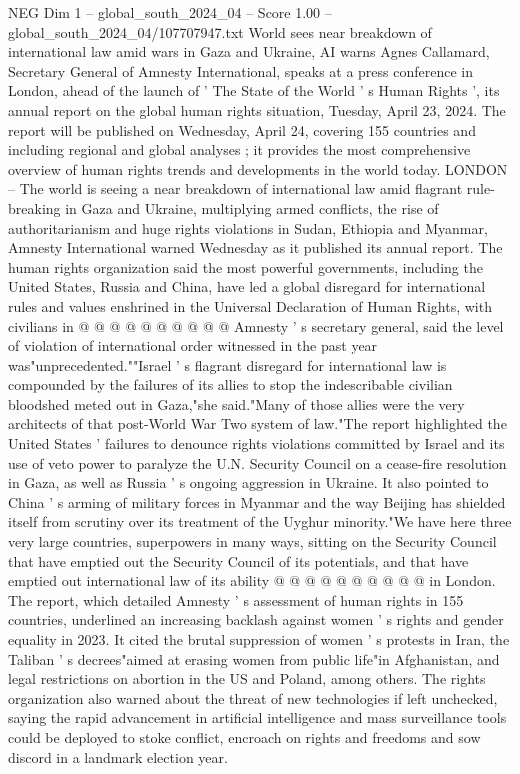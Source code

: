 \begin{textsample}{NEG Dim 1 – global\_south\_2024\_04 – Score 1.00 – global\_south\_2024\_04/107707947.txt}  \label{ex:f1_neg_303}
World sees near breakdown of international law amid wars in Gaza and Ukraine, AI warns Agnes Callamard, Secretary General of Amnesty International, speaks at a press conference in London, ahead of the launch of ' The State of the World ' s Human Rights ', its annual report on the global human rights situation, Tuesday, April 23, 2024.
The report will be published on Wednesday, April 24, covering 155 countries and including regional and global analyses ; it provides the most comprehensive overview of human rights trends and developments in the world today.
LONDON -- The world is seeing a near breakdown of international law amid flagrant rule-breaking in Gaza and Ukraine, multiplying armed conflicts, the rise of authoritarianism and huge rights violations in Sudan, Ethiopia and Myanmar, Amnesty International warned Wednesday as it published its annual report.
The human rights organization said the most powerful governments, including the United States, Russia and China, have led a global disregard for international rules and values enshrined in the Universal Declaration of Human Rights, with civilians in @ @ @ @ @ @ @ @ @ @ Amnesty ' s secretary general, said the level of violation of international order witnessed in the past year was"unprecedented.""Israel ' s flagrant disregard for international law is compounded by the failures of its allies to stop the indescribable civilian bloodshed meted out in Gaza,"she said."Many of those allies were the very architects of that post-World War Two system of law."The report highlighted the United States ' failures to denounce rights violations committed by Israel and its use of veto power to paralyze the U.N.
Security Council on a cease-fire resolution in Gaza, as well as Russia ' s ongoing aggression in Ukraine.
It also pointed to China ' s arming of military forces in Myanmar and the way Beijing has shielded itself from scrutiny over its treatment of the Uyghur minority."We have here three very large countries, superpowers in many ways, sitting on the Security Council that have emptied out the Security Council of its potentials, and that have emptied out international law of its ability @ @ @ @ @ @ @ @ @ @ in London.
The report, which detailed Amnesty ' s assessment of human rights in 155 countries, underlined an increasing backlash against women ' s rights and gender equality in 2023.
It cited the brutal suppression of women ' s protests in Iran, the Taliban ' s decrees"aimed at erasing women from public life"in Afghanistan, and legal restrictions on abortion in the US and Poland, among others.
The rights organization also warned about the threat of new technologies if left unchecked, saying the rapid advancement in artificial intelligence and mass surveillance tools could be deployed to stoke conflict, encroach on rights and freedoms and sow discord in a landmark election year.

\end{textsample}

